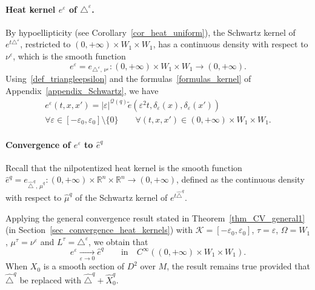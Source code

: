 \documentclass[10pt]{amsart}
\theoremstyle{definition}\newtheorem{defi}[theo]{Definition}\newtheorem{rema}[theo]{Remark}\newtheorem{exam}[theo]{Example}\newtheorem{exem}[theo]{Example}\newtheorem{nota}[theo]{Notation}
\newcommand*\R{\mathbb{R}}
\newcommand{\calQ}{\mathcal{Q}}
\newcommand{\calK}{\mathcal{K}}
\let\oldforall\forall
\renewcommand*{\forall}{\mathrel{\oldforall}}
\begin{document}
\goodbreak
\paragraph{Heat kernel $e^\varepsilon$ of $\triangle^\varepsilon$.}
By hypoellipticity (see Corollary~\ref{cor_heat_uniform}), the Schwartz kernel of $e^{t\triangle^\varepsilon}$, restricted to $(0,+\infty)\times W_1\times W_1$, has a continuous density with respect to $\nu^\varepsilon$, which is the smooth function
\[
e^\varepsilon = e_{\triangle^\varepsilon,\,\nu^\varepsilon}: (0,+\infty)\times W_1\times W_1\rightarrow(0,+\infty).
\]
Using~\eqref{def_triangleepsilon} and the formulas~\eqref{formulas_kernel} of Appendix~\ref{appendix_Schwartz}, we have
\begin{multline}\label{relation_eY_eepsilon}
e^\varepsilon(t,x,x') = \vert \varepsilon\vert^{\calQ(q)} \widetilde e\left(\varepsilon^2t,\delta_\varepsilon(x),\delta_\varepsilon(x')\right) \\
\forall \varepsilon\in[-\varepsilon_0,\varepsilon_0]\setminus\{0\} \qquad \forall (t,x,x')\in(0,+\infty)\times W_1\times W_1.
\end{multline}


\goodbreak
\paragraph{Convergence of $e^\varepsilon$ to $\widehat{e}^{q}$}
Recall that the nilpotentized heat kernel is the smooth function $\widehat{e}^{q} = e_{\widehat{\triangle}^{q},\,\widehat{\mu}^{q}}: (0,+\infty)\times\R^n\times\R^n\rightarrow(0,+\infty)$, defined as the continuous density with respect to $\widehat{\mu}^{q}$ of the Schwartz kernel of $e^{t\widehat{\triangle}^{q}}$.

Applying the general convergence result stated in Theorem~\ref{thm_CV_general1} (in Section~\ref{sec_convergence_heat_kernels}) with $\calK = [-\varepsilon_0,\varepsilon_0]$, $\tau=\varepsilon$, $\Omega=W_1$, $\mu^\tau=\nu^\varepsilon$ and $L^\tau = \triangle^\varepsilon$, we obtain that
\begin{equation}\label{CVeepsehat}
e^\varepsilon \underset{\varepsilon\rightarrow 0}{\longrightarrow} \widehat{e}^{q} \qquad\text{in}\quad C^\infty\left((0,+\infty)\times W_1\times W_1\right).
\end{equation}
When $X_0$ is a smooth section of $D^2$ over $M$, the result remains true provided that $\widehat{\triangle}^{q}$ be replaced with $\widehat{\triangle}^{q} +\widehat{X}_0^{q}$.
\end{document}
